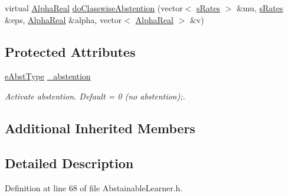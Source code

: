 \begin{DoxyCompactItemize}
\item 
virtual \hyperlink{Defaults_8h_a80184c4fd10ab70a1a17c5f97dcd1563}{Alpha\-Real} \hyperlink{classMultiBoost_1_1AbstainableLearner_a76a5ca563ef7c9b1c7f906d7a96675e3}{do\-Classwise\-Abstention} (vector$<$ \hyperlink{structMultiBoost_1_1sRates}{s\-Rates} $>$ \&mu, \hyperlink{structMultiBoost_1_1sRates}{s\-Rates} \&eps, \hyperlink{Defaults_8h_a80184c4fd10ab70a1a17c5f97dcd1563}{Alpha\-Real} \&alpha, vector$<$ \hyperlink{Defaults_8h_a80184c4fd10ab70a1a17c5f97dcd1563}{Alpha\-Real} $>$ \&v)
\end{DoxyCompactItemize}
\subsection*{Protected Attributes}
\begin{DoxyCompactItemize}
\item 
\hypertarget{classMultiBoost_1_1AbstainableLearner_a25268f708c7e9a89739273444aeffaa6}{\hyperlink{classMultiBoost_1_1AbstainableLearner_a913d773affdee935e319707266a29599}{e\-Abst\-Type} \hyperlink{classMultiBoost_1_1AbstainableLearner_a25268f708c7e9a89739273444aeffaa6}{\-\_\-abstention}}\label{classMultiBoost_1_1AbstainableLearner_a25268f708c7e9a89739273444aeffaa6}

\begin{DoxyCompactList}\small\item\em Activate abstention. Default = 0 (no abstention);. \end{DoxyCompactList}\end{DoxyCompactItemize}
\subsection*{Additional Inherited Members}


\subsection{Detailed Description}


Definition at line 68 of file Abstainable\-Learner.\-h.



